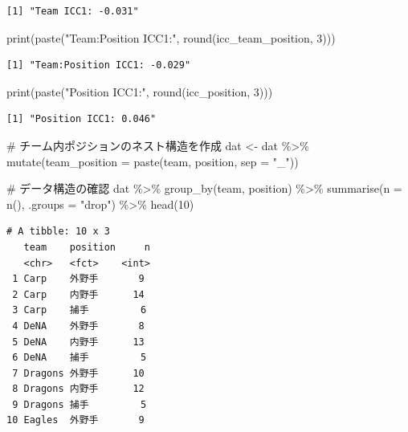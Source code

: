 \documentclass[
  a4paper,
]{ltjsbook}
\newenvironment{Shaded}{\begin{snugshade}}{\end{snugshade}}
\newcommand{\AttributeTok}[1]{\textcolor[rgb]{0.40,0.45,0.13}{#1}}
\newcommand{\CommentTok}[1]{\textcolor[rgb]{0.37,0.37,0.37}{#1}}
\newcommand{\DecValTok}[1]{\textcolor[rgb]{0.68,0.00,0.00}{#1}}
\newcommand{\FunctionTok}[1]{\textcolor[rgb]{0.28,0.35,0.67}{#1}}
\newcommand{\NormalTok}[1]{\textcolor[rgb]{0.00,0.23,0.31}{#1}}
\newcommand{\OtherTok}[1]{\textcolor[rgb]{0.00,0.23,0.31}{#1}}
\newcommand{\SpecialCharTok}[1]{\textcolor[rgb]{0.37,0.37,0.37}{#1}}
\newcommand{\StringTok}[1]{\textcolor[rgb]{0.13,0.47,0.30}{#1}}
\begin{document}
\begin{verbatim}
[1] "Team ICC1: -0.031"
\end{verbatim}

\begin{Shaded}
\begin{Highlighting}[]
\FunctionTok{print}\NormalTok{(}\FunctionTok{paste}\NormalTok{(}\StringTok{"Team:Position ICC1:"}\NormalTok{, }\FunctionTok{round}\NormalTok{(icc\_team\_position, }\DecValTok{3}\NormalTok{)))}
\end{Highlighting}
\end{Shaded}

\begin{verbatim}
[1] "Team:Position ICC1: -0.029"
\end{verbatim}

\begin{Shaded}
\begin{Highlighting}[]
\FunctionTok{print}\NormalTok{(}\FunctionTok{paste}\NormalTok{(}\StringTok{"Position ICC1:"}\NormalTok{, }\FunctionTok{round}\NormalTok{(icc\_position, }\DecValTok{3}\NormalTok{)))}
\end{Highlighting}
\end{Shaded}

\begin{verbatim}
[1] "Position ICC1: 0.046"
\end{verbatim}

\begin{Shaded}
\begin{Highlighting}[]
\CommentTok{\# チーム内ポジションのネスト構造を作成}
\NormalTok{dat }\OtherTok{\textless{}{-}}\NormalTok{ dat }\SpecialCharTok{\%\textgreater{}\%}
    \FunctionTok{mutate}\NormalTok{(}\AttributeTok{team\_position =} \FunctionTok{paste}\NormalTok{(team, position, }\AttributeTok{sep =} \StringTok{"\_"}\NormalTok{))}

\CommentTok{\# データ構造の確認}
\NormalTok{dat }\SpecialCharTok{\%\textgreater{}\%} 
    \FunctionTok{group\_by}\NormalTok{(team, position) }\SpecialCharTok{\%\textgreater{}\%} 
    \FunctionTok{summarise}\NormalTok{(}\AttributeTok{n =} \FunctionTok{n}\NormalTok{(), }\AttributeTok{.groups =} \StringTok{"drop"}\NormalTok{) }\SpecialCharTok{\%\textgreater{}\%} 
    \FunctionTok{head}\NormalTok{(}\DecValTok{10}\NormalTok{)}
\end{Highlighting}
\end{Shaded}

\begin{verbatim}
# A tibble: 10 x 3
   team    position     n
   <chr>   <fct>    <int>
 1 Carp    外野手       9
 2 Carp    内野手      14
 3 Carp    捕手         6
 4 DeNA    外野手       8
 5 DeNA    内野手      13
 6 DeNA    捕手         5
 7 Dragons 外野手      10
 8 Dragons 内野手      12
 9 Dragons 捕手         5
10 Eagles  外野手       9
\end{verbatim}
\end{document}
